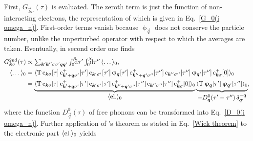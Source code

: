 First, $G_{\vec k \sigma}(\tau)$ is evaluated. The zeroth term is just the
 function of non-interacting electrons, the 
representation of which is given in Eq.~\ref{G_0(i omega_n)}. First-order terms
vanish because $\upphi_{\vec q}$ does not conserve the particle number, unlike
the unperturbed  operator with respect to which the averages are
taken. Eventually, in second order one finds
%
\begin{align} \label{Holstein 2nd}
    G \super{2nd}_{\vec k \sigma}(\tau) &\propto
    \sum_{\vec k' \vec k'' \sigma \sigma' \vec q \vec q'}
    \int \from 0 \till \beta \D \tau' \int \from 0 \till \beta \D \tau'' \,
    \av \dots_0,
    \\ \notag
    \av \dots_0 &= \av{\op T \,
        \op c_{\vec k \sigma}[\tau] \,
        \op c_{\vec k' + \vec q \sigma'}^+[\tau'] \,
        \op c_{\vec k' \sigma'}[\tau'] \,
        \upphi_{\vec q}[\tau'] \,
        \op c_{\vec k'' + \vec q' \sigma''}^+[\tau''] \,
        \op c_{\vec k'' \sigma''}[\tau''] \,
        \upphi_{\vec q'}[\tau''] \,
        \op c_{\vec k \sigma}^+[0]}_0
    \\ \notag
    &= \underbrace{
            \av{\op T \,
                \op c_{\vec k \sigma}[\tau] \,
                \op c_{\vec k' + \vec q \sigma'}^+[\tau'] \,
                \op c_{\vec k' \sigma'}[\tau'] \,
                \op c_{\vec k'' + \vec q' \sigma''}^+[\tau''] \,
                \op c_{\vec k'' \sigma''}[\tau''] \,
                \op c_{\vec k \sigma}^+[0]}_0
            }_{\displaystyle \av{\text{el.}}_0}
        \underbrace{
            \av{\op T \,
                \vphantom{c_{\vec k' + \vec q}^+}
                \upphi_{\vec q}[\tau'] \,
                \upphi_{\vec q'}[\tau'']}_0
            }_{\displaystyle -D^0_{\vec q}(\tau' - \tau'') \,
                \delta_{\vec q'}^{-\vec q}},
\end{align}
%
where the  function $D^0_{\vec q}(\tau)$ of free phonons can be
transformed into Eq.~\ref{D_0(i omega_n)}. Further application of 's
theorem as stated in Eq.~\ref{Wick theorem} to the electronic part
$\langle\text{el.}\rangle_0$ yields
%
\begingroup
    \def\minalignsep{0pt}
